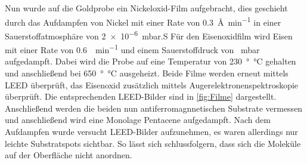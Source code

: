        Nun wurde auf die Goldprobe ein Nickeloxid-Film aufgebracht, dies geschieht durch das Aufdampfen von Nickel mit einer Rate von \SI{0.3}{\angstrom\per\minute} in einer Sauerstoffatmosphäre von \SI{2e-6}{\milli\bar}.S
        Für den Eisenoxidfilm wird Eisen mit einer Rate von \SI{0.6}{\ML\per\minute} und einem Sauerstoffdruck von \SI{}{\milli\bar} aufgedampft.
        Dabei wird die Probe auf eine Temperatur von \SI{230}{\degree\celsius} gehalten und anschließend bei \SI{650}{\degree\celsius} ausgeheizt.
        Beide Filme werden erneut mittels LEED überprüft, das Eisenoxid zusätzlich mittels Augerelektronenspektroskopie überprüft.
        Die entsprechenden LEED-Bilder sind in \autoref{fig:Filme} dargestellt.
        Anschließend werden die beiden nun antiferromagnnetischen Substrate vermessen und anschließend wird eine Monolage Pentacene aufgedampft.
        Nach dem Aufdampfen wurde versucht LEED-Bilder aufzunehmen, es waren allerdings nur leichte Substratspots sichtbar.
        So lässt sich schlussfolgern, dass sich die Moleküle auf der Oberfläche nicht anordnen.

        


